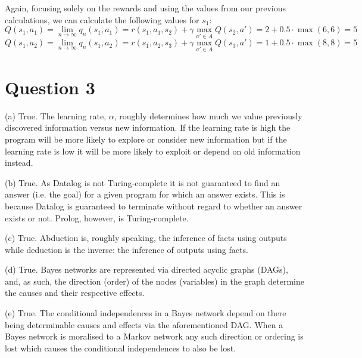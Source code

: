 \documentclass[12pt]{article}
\begin{document}
Again, focusing solely on the rewards and using the values from our previous calculations, we can calculate the following values for $s_1$:
$$Q(s_1, a_1) = \lim_{n \rightarrow \infty} q_n(s_1, a_1) = r(s_1, a_1, s_2) + \gamma \max_{a' \in A}Q(s_2, a') = 2 + 0.5 \cdot \max(6, 6) = 5$$
$$Q(s_1, a_2) = \lim_{n \rightarrow \infty} q_n(s_1, a_2) = r(s_1, a_2, s_3) + \gamma \max_{a' \in A}Q(s_3, a') = 1 + 0.5 \cdot \max(8, 8) = 5$$

\section*{Question 3}

\noindent (a) True. The learning rate, $\alpha$, roughly determines how much we value previously discovered information versus new information. If the learning rate is high the program will be more likely to explore or consider new information but if the learning rate is low it will be more likely to exploit or depend on old information instead.

\noindent (b) True. As Datalog is not Turing-complete it is not guaranteed to find an answer (i.e. the goal) for a given program for which an answer exists. This is because Datalog is guaranteed to terminate without regard to whether an answer exists or not. Prolog, however, is Turing-complete.

\noindent (c) True. Abduction is, roughly speaking, the inference of facts using outputs while deduction is the inverse: the inference of outputs using facts.

\noindent (d) True. Bayes networks are represented via directed acyclic graphs (DAGs), and, as such, the direction (order) of the nodes (variables) in the graph determine the causes and their respective effects.

\noindent (e) True. The conditional independences in a Bayes network depend on there being determinable causes and effects via the aforementioned DAG. When a Bayes network is moralised to a Markov network any such direction or ordering is lost which causes the conditional independences to also be lost.
\end{document}
